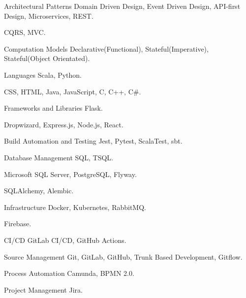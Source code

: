   \begin{cvskills}
    \cvskill
      {Architectural Patterns} 
      { Domain Driven Design, Event Driven Design, API-first Design, Microservices, REST.}
    
    \cvskill
      {} 
      { CQRS, MVC.}
    
    \cvskill
      {Computation Models} 
      { Declarative(Functional), Stateful(Imperative), Stateful(Object Orientated).} 
    
    \cvskill
      {Languages} 
      { Scala, Python.}
    
    \cvskill
      {} 
      { CSS, HTML, Java, JavaScript, C, C++, C\#.}
    
    \cvskill
      {Frameworks and Libraries} 
      { Flask.}
    
    \cvskill
      {} 
      { Dropwizard, Express.js, Node.js, React.}
    
    \cvskill
      {Build Automation and Testing} 
      { Jest, Pytest, ScalaTest, sbt.} 
    
    \cvskill
      {Database Management} 
      { SQL, TSQL.}
    
    \cvskill
      {} 
      { Microsoft SQL Server, PostgreSQL, Flyway.}
    
    \cvskill
      {} 
      { SQLAlchemy, Alembic.}
    
    \cvskill
      {Infrastructure} 
      { Docker, Kubernetes, RabbitMQ.} 
    
    \cvskill
      {} 
      { Firebase.} 
    
    \cvskill
      {CI/CD} 
      { GitLab CI/CD, GitHub Actions.} 
    
    \cvskill
      {Source Management} 
      { Git, GitLab, GitHub, Trunk Based Development, Gitflow.} 
    
    \cvskill
      {Process Automation}
      { Camunda, BPMN 2.0.}
    
    \cvskill
      {Project Management} 
      { Jira.} 
  \end{cvskills}
